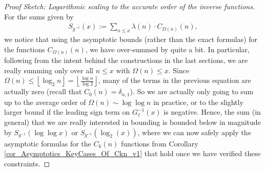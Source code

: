 \documentclass[11pt,reqno,a4letter]{article}
\numberwithin{figure}{section}
\numberwithin{table}{section}
\newcommand{\floor}[1]{\left\lfloor #1 \right\rfloor}
\newcommand{\Floor}[2]{\ensuremath{\left\lfloor \frac{#1}{#2} \right\rfloor}}
\theoremstyle{plain}
\numberwithin{theorem}{section}
\theoremstyle{definition}
\begin{document}
\begin{proof}[Proof Sketch: Logarithmic scaling to the accurate order of the inverse functions] 
For the sums given by 
\begin{align*} 
S_{g^{-1}}(x) := \sum_{n \leq x} \lambda(n) \cdot C_{\Omega(n)}(n), 
\end{align*} 
we notice that using the asymptotic bounds (rather than the exact formulas) for the functions 
$C_{\Omega(n)}(n)$, we have over-summed by quite a bit. 
In particular, following from the intent behind the constructions in the last sections, 
we are really summing only over all $n \leq x$ with $\Omega(n) \leq x$. 
Since $\Omega(n) \leq \floor{\log_2 n} = \Floor{\log n}{\log 2}$, 
many of the terms in the previous equation are actually zero (recall that $C_0(n) = \delta_{n,1}$). 
So we are actually only going to sum up to the average order of 
$\Omega(n) \sim \log\log n$ in practice, or to the slightly larger bound if the leading sign term on 
$G_{\ell}^{-1}(x)$ is negative. 
Hence, the sum (in general) that we are really interested in bounding is 
bounded below in magnitude by $S_{g^{-1}}(\log\log x)$ or 
$S_{g^{-1}}(\log_2(x))$, where we can now safely apply the 
asymptotic formulas for the $C_k(n)$ functions from 
Corollary \ref{cor_Asymptotics_KeyCases_Of_Ckn_v1} 
that hold once we have verified these constraints. 
\end{proof} 
\end{document}
